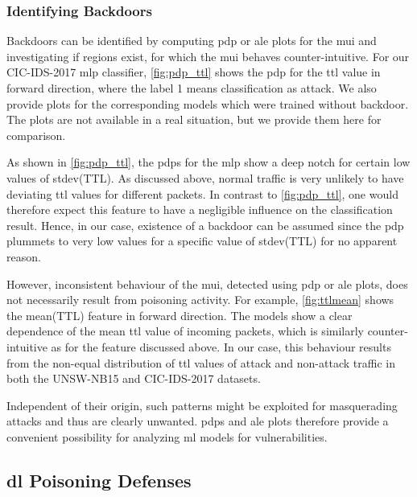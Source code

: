 \documentclass[9pt,sigconf,letterpaper,dvipsnames\ifx\removeHeaders\tempYes ,nonacm\fi]{acmart}
\newcommand{\unsw}{UNSW-NB15}
\newcommand{\cic}{CIC-IDS-2017}
\begin{document}
\subsubsection{Identifying Backdoors}

Backdoors can be identified by computing \gls{pdp} or \gls{ale} plots for the \gls{mui} and investigating if regions exist, for which the \gls{mui} behaves counter-intuitive. For our \cic{} \gls{mlp} classifier, \autoref{fig:pdp_ttl} shows the \gls{pdp} for the \gls{ttl} value in forward direction, where the label 1 means classification as attack. We also provide plots for the corresponding models which were trained without backdoor. The plots are not available in a real situation, but we provide them here for comparison.

As shown in \autoref{fig:pdp_ttl}, the \glspl{pdp} for the \gls{mlp} show a deep notch for certain low values of stdev(TTL). As discussed above, normal traffic is very unlikely to have deviating \gls{ttl} values for different packets. In contrast to \autoref{fig:pdp_ttl}, one would therefore expect this feature to have a negligible influence on the classification result. Hence, in our case,
existence of a backdoor can be assumed since the \gls{pdp} plummets to very low values for a specific value of stdev(TTL) for no apparent reason.


However, inconsistent behaviour of the \gls{mui}, detected using \gls{pdp} or \gls{ale} plots, does not necessarily result from poisoning activity.  For example, \autoref{fig:ttlmean} shows the mean(TTL) feature in forward direction. The models show a clear dependence of the mean \gls{ttl} value of incoming packets, which is similarly counter-intuitive as for the feature discussed above. In our case, this behaviour results from the non-equal distribution of \gls{ttl} values of attack and non-attack traffic in both the \unsw{} and \cic{} datasets.


Independent of their origin, such patterns might be exploited for masquerading attacks and thus are clearly unwanted.
\glspl{pdp} and \gls{ale} plots therefore provide a convenient possibility for analyzing \gls{ml} models for vulnerabilities. %






\subsection{\gls{dl} Poisoning Defenses}
\end{document}

